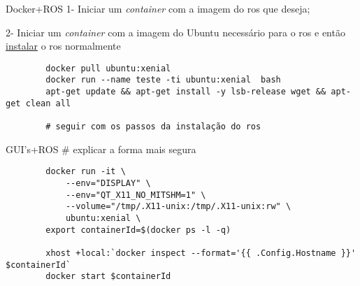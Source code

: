 \begin{frame}[fragile, t]{Docker+ROS}
    1- Iniciar um \textit{container} com a imagem do ros que deseja; 
    
    2- Iniciar um \textit{container} com a imagem do Ubuntu necessário para o ros e então \href{http://wiki.ros.org/kinetic/Installation/Ubuntu}{instalar} o ros normalmente
    \begin{lstlisting}
        docker pull ubuntu:xenial
        docker run --name teste -ti ubuntu:xenial  bash
        apt-get update && apt-get install -y lsb-release wget && apt-get clean all  

        # seguir com os passos da instalação do ros

    \end{lstlisting}
\end{frame}
\begin{frame}[fragile, t]{GUI's+ROS}
    # explicar a forma mais segura
    \begin{lstlisting}
        docker run -it \
            --env="DISPLAY" \
            --env="QT_X11_NO_MITSHM=1" \
            --volume="/tmp/.X11-unix:/tmp/.X11-unix:rw" \
            ubuntu:xenial \
        export containerId=$(docker ps -l -q)

        xhost +local:`docker inspect --format='{{ .Config.Hostname }}' $containerId`
        docker start $containerId

    \end{lstlisting}
\end{frame}
